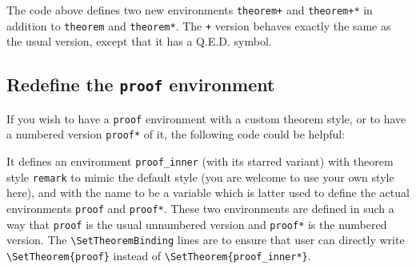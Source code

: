 \documentclass[classical]{einfart}
\newcommand{\commandoption}[1]{\texttt{\textcolor{code-keys}{#1}}}
\begin{document}
The code above defines two new environments \lstinline|theorem+| and \lstinline|theorem+*| in addition to \lstinline|theorem| and \lstinline|theorem*|. The \lstinline|+| version behaves exactly the same as the usual version, except that it has a Q.E.D. symbol.

\subsection{Redefine the {\normalfont\texttt{proof}} environment}

If you wish to have a {\normalfont\texttt{proof}} environment with a custom theorem style, or to have a numbered version {\normalfont\texttt{proof*}} of it, the following code could be helpful:


It defines an environment \lstinline|proof_inner| (with its starred variant) with theorem style \lstinline|remark| to mimic the default style (you are welcome to use your own style here), and with the name to be a variable which is latter used to define the actual environments \lstinline|proof| and \lstinline|proof*|. These two environments are defined in such a way that \lstinline|proof| is the usual unnumbered version and \lstinline|proof*| is the numbered version. The \lstinline|\SetTheoremBinding| lines are to ensure that user can directly write \lstinline|\SetTheorem{proof}| instead of \lstinline|\SetTheorem{proof_inner*}|.
\end{document}
